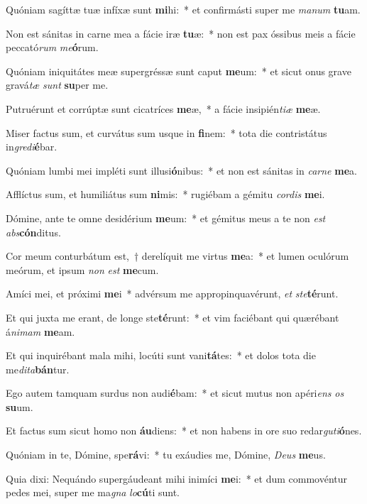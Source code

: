 \item Quóniam sagíttæ tuæ infíxæ sunt \textbf{mi}hi:~* et confirmásti super me \textit{manum} \textbf{tu}am.
\item Non est sánitas in carne mea a fácie iræ \textbf{tu}æ:~* non est pax óssibus meis a fácie peccató\textit{rum} \textit{me}\textbf{ó}rum.
\item Quóniam iniquitátes meæ supergréssæ sunt caput \textbf{me}um:~* et sicut onus grave gravá\textit{tæ} \textit{sunt} \textbf{su}per me.
\item Putruérunt et corrúptæ sunt cicatríces \textbf{me}æ,~* a fácie insipién\textit{tiæ} \textbf{me}æ.
\item Miser factus sum, et curvátus sum usque in \textbf{fi}nem:~* tota die contristátus in\textit{gredi}\textbf{é}bar.
\item Quóniam lumbi mei impléti sunt illusi\textbf{ó}nibus:~* et non est sánitas in \textit{carne} \textbf{me}a.
\item Afflíctus sum, et humiliátus sum \textbf{ni}mis:~* rugiébam a gémitu \textit{cordis} \textbf{me}i.
\item Dómine, ante te omne desidérium \textbf{me}um:~* et gémitus meus a te non \textit{est} \textit{abs}\textbf{cón}ditus.
\item Cor meum conturbátum est,~† derelíquit me virtus \textbf{me}a:~* et lumen oculórum meórum, et ipsum \textit{non} \textit{est} \textbf{me}cum.
\item Amíci mei, et próximi \textbf{me}i~* advérsum me appropinquavérunt, \textit{et} \textit{ste}\textbf{té}runt.
\item Et qui juxta me erant, de longe ste\textbf{té}runt:~* et vim faciébant qui quærébant á\textit{nimam} \textbf{me}am.
\item Et qui inquirébant mala mihi, locúti sunt vani\textbf{tá}tes:~* et dolos tota die me\hspace{0.03em}\textit{dita}\textbf{bán}tur.
\item Ego autem tamquam surdus non audi\textbf{é}bam:~* et sicut mutus non apéri\textit{ens} \textit{os} \textbf{su}um.
\item Et factus sum sicut homo non \textbf{áu}diens:~* et non habens in ore suo redar\textit{guti}\textbf{ó}nes.
\item Quóniam in te, Dómine, spe\textbf{rá}vi:~* tu exáudies me, Dómine, \textit{Deus} \textbf{me}us.
\item Quia dixi: Nequándo supergáudeant mihi inimíci \textbf{me}i:~* et dum commovéntur pedes mei, super me ma\textit{gna} \textit{lo}\textbf{cú}ti sunt.
